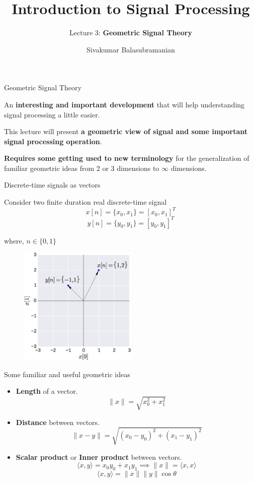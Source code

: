 \documentclass{beamer}
\title{Introduction to Signal Processing}
\subtitle{Lecture 3: \textbf{Geometric Signal Theory}}
\author{Sivakumar Balasubramanian}
\institute[Christian Medical College] %
{
  \inst{}%
  Department of Bioengineering\\
  Christian Medical College, Bagayam\\
  Vellore 632002
}
\date{}
\begin{document}
\begin{frame}
  \titlepage
\end{frame}

\begin{frame}{Geometric Signal Theory}

An \textbf{interesting and important development} that will help understanding signal processing a little easier.

\vspace{4mm}

This lecture will present \textbf{a geometric view of signal and some important signal processing operation}.

\vspace{4mm}

\textbf{Requires some getting used to new terminology} for the generalization of familiar geometric ideas from 2 or 3 dimensions to $\infty$ dimensions.

\end{frame}

\begin{frame}{Discrete-time signals as vectors}

Consider two finite duration real discrete-time signal 
\[ x[n] = \{\boxed{x_0}, x_1\} = \left[x_0, x_1\right]^{T} \]
\[ y[n] = \{\boxed{y_0}, y_1\} = \left[y_0, y_1\right]^{T} \]

where, $n \in \{0, 1\}$

\begin{figure}
\includegraphics[width=0.5\textwidth]{img/2dvec.eps}
\end{figure}
\end{frame}

\begin{frame}{Some familiar and useful geometric ideas}

\begin{itemize}
\item \textbf{Length} of a vector.
\[ \|x\| = \sqrt{x_0^2 + x_1^2} \]
\item \textbf{Distance} between vectors.
\[ \|x - y\| = \sqrt{\left(x_0 - y_0\right)^2 + \left(x_1 - y_1\right)^2} \]
\item \textbf{Scalar product} or \textbf{Inner product} between vectors.
\[ \langle x, y \rangle = x_0y_0 + x_1y_1 \implies \|x\| = \langle x, x \rangle \]
\[ \langle x, y \rangle = \|x\| \|y\| \cos \theta \]
\end{itemize}
\end{frame}
\end{document}
